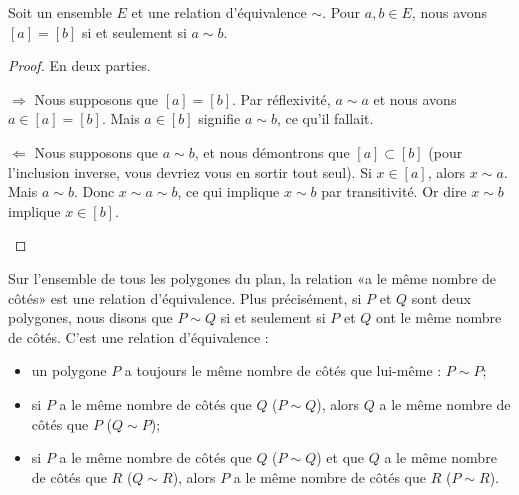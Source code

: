 \begin{lemma}
    Soit un ensemble \( E\) et une relation d'équivalence \( \sim\). Pour \( a,b\in E\), nous avons \( [a]=[b]\) si et seulement si \( a\sim b\).
\end{lemma}

\begin{proof}
    En deux parties.
    \begin{subproof}
        \item[\( \Rightarrow\)]
            Nous supposons que \( [a]=[b]\). Par réflexivité, \( a\sim a\) et nous avons \( a\in [a]=[b]\). Mais \( a\in [b]\) signifie \( a\sim b\), ce qu'il fallait.
        \item[\( \Leftarrow\)]
            Nous supposons que \( a\sim b\), et nous démontrons que \( [a]\subset [b]\) (pour l'inclusion inverse, vous devriez vous en sortir tout seul). Si \( x\in [a]\), alors \( x\sim a\). Mais \( a\sim b\). Donc \( x\sim a\sim b\), ce qui implique \( x\sim b\) par transitivité. Or dire \( x\sim b\) implique \( x\in [b]\).
    \end{subproof}
\end{proof}

\begin{example}
    Sur l'ensemble de tous les polygones du plan, la relation «a le même nombre de côtés» est une relation d'équivalence. Plus précisément, si $P$ et $Q$ sont deux polygones, nous disons que $P\sim Q$ si et seulement si $P$ et $Q$ ont le même nombre de côtés. C'est une relation d'équivalence :
    \begin{itemize}
        \item
            un polygone $P$ a toujours le même nombre de côtés que lui-même : $P\sim P$;
        \item
            si $P$ a le même nombre de côtés que $Q$ ($P\sim Q$), alors $Q$ a le même nombre de côtés que $P$ ($Q\sim P$);
        \item
            si $P$ a le même nombre de côtés que $Q$ ($P\sim Q$) et que $Q$ a le même nombre de côtés que $R$ ($Q\sim R$), alors $P$ a le même nombre de côtés que $R$ ($P\sim R$).
    \end{itemize}
\end{example}


